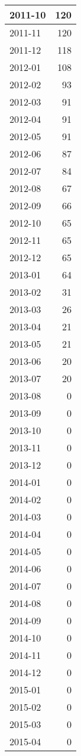 \documentclass[
]{article}
\begin{document}
\begin{table}[H]
\begin{tabular}{l|r}
\hline
2011-10 & 120\\
\hline
2011-11 & 120\\
\hline
2011-12 & 118\\
\hline
2012-01 & 108\\
\hline
2012-02 & 93\\
\hline
2012-03 & 91\\
\hline
2012-04 & 91\\
\hline
2012-05 & 91\\
\hline
2012-06 & 87\\
\hline
2012-07 & 84\\
\hline
2012-08 & 67\\
\hline
2012-09 & 66\\
\hline
2012-10 & 65\\
\hline
2012-11 & 65\\
\hline
2012-12 & 65\\
\hline
2013-01 & 64\\
\hline
2013-02 & 31\\
\hline
2013-03 & 26\\
\hline
2013-04 & 21\\
\hline
2013-05 & 21\\
\hline
2013-06 & 20\\
\hline
2013-07 & 20\\
\hline
2013-08 & 0\\
\hline
2013-09 & 0\\
\hline
2013-10 & 0\\
\hline
2013-11 & 0\\
\hline
2013-12 & 0\\
\hline
2014-01 & 0\\
\hline
2014-02 & 0\\
\hline
2014-03 & 0\\
\hline
2014-04 & 0\\
\hline
2014-05 & 0\\
\hline
2014-06 & 0\\
\hline
2014-07 & 0\\
\hline
2014-08 & 0\\
\hline
2014-09 & 0\\
\hline
2014-10 & 0\\
\hline
2014-11 & 0\\
\hline
2014-12 & 0\\
\hline
2015-01 & 0\\
\hline
2015-02 & 0\\
\hline
2015-03 & 0\\
\hline
2015-04 & 0\\

\end{tabular}
\end{table}
\end{document}
